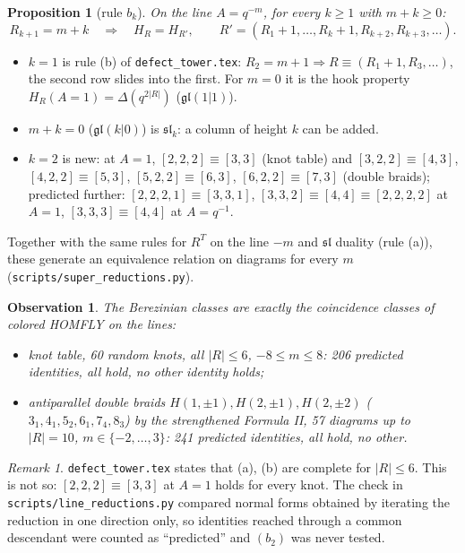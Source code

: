 \documentclass[11pt]{article}
\newtheorem{observation}{Observation}
\newtheorem{proposition}{Proposition}
\theoremstyle{remark}
\newtheorem{remark}{Remark}
\begin{document}
\begin{proposition}[rule $b_k$]
On the line $A=q^{-m}$, for every $k\ge1$ with $m+k\ge0$:
\[
  R_{k+1}=m+k\quad\Longrightarrow\quad H_R=H_{R'},\qquad R'=(R_1+1,\dots,R_k+1,R_{k+2},R_{k+3},\dots).
\]
\end{proposition}
\begin{itemize}
\item $k=1$ is rule (b) of \texttt{defect\_tower.tex}: $R_2=m+1\Rightarrow R\equiv(R_1+1,R_3,\dots)$, the second row
slides into the first.  For $m=0$ it is the hook property $H_R(A=1)=\Delta(q^{2|R|})$ ($\mathfrak{gl}(1|1)$).
\item $m+k=0$ ($\mathfrak{gl}(k|0)$) is $\mathfrak{sl}_k$: a column of height $k$ can be added.
\item $k=2$ is new: at $A=1$, $[2,2,2]\equiv[3,3]$ (knot table) and $[3,2,2]\equiv[4,3]$, $[4,2,2]\equiv[5,3]$,
$[5,2,2]\equiv[6,3]$, $[6,2,2]\equiv[7,3]$ (double braids); predicted further: $[2,2,2,1]\equiv[3,3,1]$,
$[3,3,2]\equiv[4,4]\equiv[2,2,2,2]$ at $A=1$, $[3,3,3]\equiv[4,4]$ at $A=q^{-1}$.
\end{itemize}
Together with the same rules for $R^T$ on the line $-m$ and $\mathfrak{sl}$ duality (rule (a)), these generate an
equivalence relation on diagrams for every $m$ (\texttt{scripts/super\_reductions.py}).

\begin{observation}
The Berezinian classes are exactly the coincidence classes of colored HOMFLY on the lines:
\begin{itemize}
\item knot table, 60 random knots, all $|R|\le6$, $-8\le m\le8$: 206 predicted identities, all hold, no other
identity holds;
\item antiparallel double braids $H(1,\pm1),H(2,\pm1),H(2,\pm2)$ ($3_1,4_1,5_2,6_1,7_4,8_3$) by the strengthened
Formula II, 57 diagrams up to $|R|=10$, $m\in\{-2,\dots,3\}$: 241 predicted identities, all hold, no other.
\end{itemize}
\end{observation}
\begin{remark}
\texttt{defect\_tower.tex} states that (a), (b) are complete for $|R|\le6$.  This is not so: $[2,2,2]\equiv[3,3]$ at $A=1$
holds for every knot.  The check in \texttt{scripts/line\_reductions.py} compared normal forms obtained by
iterating the reduction in one direction only, so identities reached through a common descendant were counted as
``predicted'' and $(b_2)$ was never tested.
\end{remark}
\end{document}
